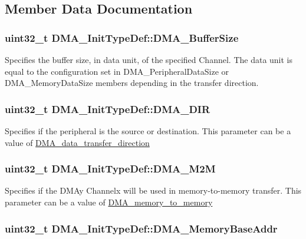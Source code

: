 \subsection{Member Data Documentation}
\hypertarget{structDMA__InitTypeDef_a999df57215b28b3b1b3b6836c4952ca5}{
\subsubsection[{DMA\_\-BufferSize}]{\setlength{\rightskip}{0pt plus 5cm}uint32\_\-t {\bf DMA\_\-InitTypeDef::DMA\_\-BufferSize}}}
\label{structDMA__InitTypeDef_a999df57215b28b3b1b3b6836c4952ca5}
Specifies the buffer size, in data unit, of the specified Channel. The data unit is equal to the configuration set in DMA\_\-PeripheralDataSize or DMA\_\-MemoryDataSize members depending in the transfer direction. \hypertarget{structDMA__InitTypeDef_a91b47435ccf4a40efa97bbbe631789e1}{
\subsubsection[{DMA\_\-DIR}]{\setlength{\rightskip}{0pt plus 5cm}uint32\_\-t {\bf DMA\_\-InitTypeDef::DMA\_\-DIR}}}
\label{structDMA__InitTypeDef_a91b47435ccf4a40efa97bbbe631789e1}
Specifies if the peripheral is the source or destination. This parameter can be a value of \hyperlink{group__DMA__data__transfer__direction}{DMA\_\-data\_\-transfer\_\-direction} \hypertarget{structDMA__InitTypeDef_a57944cc447e6fcde4e9aa6229d3b4c5d}{
\subsubsection[{DMA\_\-M2M}]{\setlength{\rightskip}{0pt plus 5cm}uint32\_\-t {\bf DMA\_\-InitTypeDef::DMA\_\-M2M}}}
\label{structDMA__InitTypeDef_a57944cc447e6fcde4e9aa6229d3b4c5d}
Specifies if the DMAy Channelx will be used in memory-\/to-\/memory transfer. This parameter can be a value of \hyperlink{group__DMA__memory__to__memory}{DMA\_\-memory\_\-to\_\-memory} \hypertarget{structDMA__InitTypeDef_a41e7d463f0cfbcedf3170d7d27d088df}{
\subsubsection[{DMA\_\-MemoryBaseAddr}]{\setlength{\rightskip}{0pt plus 5cm}uint32\_\-t {\bf DMA\_\-InitTypeDef::DMA\_\-MemoryBaseAddr}}}
